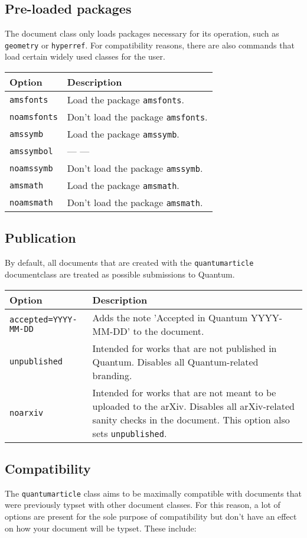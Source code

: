 \documentclass[a4paper,noarxiv,onecolumn]{quantumarticle}
\newcommand*{\ditto}{--- \raisebox{-0.5ex}{''} ---}
\newenvironment{options}
	{\medskip\noindent\begin{longtable}{p{.20\columnwidth}p{.744\columnwidth}}
	\textsf{Option} & \textsf{Description} \\
	\midrule
	}
	{\bottomrule\end{longtable}}
\newcommand{\option}[2]{
	\small\texttt{#1} & {\small#2} \\
}
\newcommand{\compatibilityoption}[2]{
	\small\texttt{\textcolor{quantumgray}{#1}} & \small\textcolor{quantumgray}{#2} \\
}
\begin{document}
	\subsection{Pre-loaded packages}
	The document class only loads packages necessary for its operation, such as \texttt{geometry} or \texttt{hyperref}. For compatibility reasons, there are also commands that load certain widely used classes for the user.
	
	\begin{options}
		\option{amsfonts}{
			Load the package \texttt{amsfonts}.
		}
		\compatibilityoption{noamsfonts}{
			Don't load the package \texttt{amsfonts}.
		}
		\option{amssymb}{
			Load the package \texttt{amssymb}.
		}
		\option{amssymbol}{
			\ditto
		}
		\compatibilityoption{noamssymb}{
			Don't load the package \texttt{amssymb}.
		}
		\option{amsmath}{
			Load the package \texttt{amsmath}.
		}
		\compatibilityoption{noamsmath}{
			Don't load the package \texttt{amsmath}.
		}
	\end{options}

	\subsection{Publication}
	By default, all documents that are created with the \texttt{quantumarticle} documentclass are treated as possible submissions to Quantum. 
	
	\begin{options}
		\option{accepted=YYYY-MM-DD}{
			Adds the note 'Accepted in Quantum YYYY-MM-DD' to the document.
		}
		\option{unpublished}{
			Intended for works that are not published in Quantum. Disables all Quantum-related branding.
		}
		\option{noarxiv}{
			Intended for works that are not meant to be uploaded to the arXiv. Disables all arXiv-related sanity checks in the document. This option also sets \texttt{unpublished}.
		}
	\end{options}

	\subsection{Compatibility}
	The \texttt{quantumarticle} class aims to be maximally compatible with documents that were previously typset with other document classes. For this reason, a lot of options are present for the sole purpose of compatibility but don't have an effect on how your document will be typset. These include:
	
\end{document}
